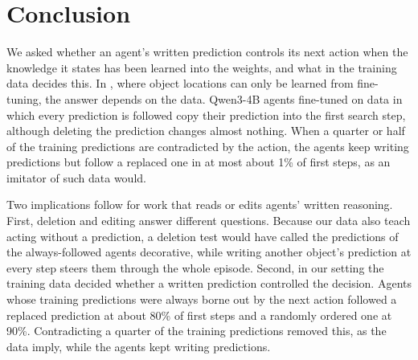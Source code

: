 \section{Conclusion}
\label{sec:conclusion}

We asked whether an agent's written prediction controls its next action when the knowledge it states has been learned into the weights, and what in the training data decides this. In \alfcf{}, where object locations can only be learned from fine-tuning, the answer depends on the data. Qwen3-4B agents fine-tuned on data in which every prediction is followed copy their prediction into the first search step, although deleting the prediction changes almost nothing. When a quarter or half of the training predictions are contradicted by the action, the agents keep writing predictions but follow a replaced one in at most about 1\% of first steps, as an imitator of such data would.

Two implications follow for work that reads or edits agents' written reasoning. First, deletion and editing answer different questions. Because our data also teach acting without a prediction, a deletion test would have called the predictions of the always-followed agents decorative, while writing another object's prediction at every step steers them through the whole episode. Second, in our setting the training data decided whether a written prediction controlled the decision. Agents whose training predictions were always borne out by the next action followed a replaced prediction at about 80\% of first steps and a randomly ordered one at 90\%. Contradicting a quarter of the training predictions removed this, as the data imply, while the agents kept writing predictions.
